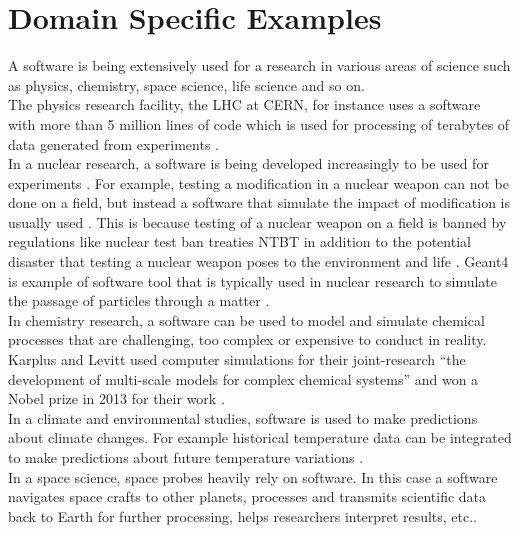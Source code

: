 \section{Domain Specific Examples}
\label{sec:Roles:Domain}

A software is being extensively used for a research in various areas of science such as physics, chemistry, space science, life science and so on.\\

The physics research facility, the \ac{LHC} at \ac{CERN}, for instance uses a software with more than 5 million lines of code which is used for processing of terabytes of data generated from experiments \citep{storer2017bridging}.\\

In a nuclear research, a software is being developed increasingly to be used for experiments \citep{yan2017case}. For example, testing a modification in a nuclear weapon can not be done on a field, but instead a software that simulate the impact of modification is usually used \citep{kanewala2014testing}. This is because testing of a nuclear weapon on a field is banned by regulations like nuclear test ban treaties \ac{NTBT} in addition to the potential disaster that testing a nuclear weapon poses to the environment and life \citep{enwiki:1053274189}. \ac{Geant4} is example of software tool that is typically used in nuclear research to simulate the passage of particles through a matter \citep{enwiki:1077695266}.  \\


In chemistry research, a software can be used to model and simulate chemical processes that are challenging, too complex or expensive to conduct in reality. Karplus and Levitt used computer simulations for their joint-research “the development of multi-scale models for complex chemical systems”  and won a Nobel prize in 2013 for their work \citep{storer2017bridging, andre2014nobel}.\\

In a climate and environmental studies, software is used to make predictions about climate changes. For example historical temperature data can be integrated to make predictions about future temperature variations \citep{storer2017bridging}.  \\


In a space science, space probes heavily rely on software. In this case a software navigates space crafts to other planets, processes and transmits scientific data back to Earth for further processing, helps researchers interpret results, etc.\citep{lutz2011software}. \\

